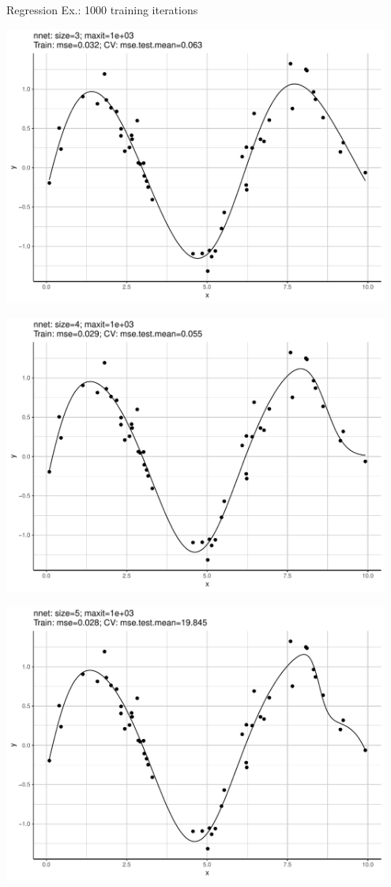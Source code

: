 \begin{vbframe}{Regression Ex.: 1000 training iterations}
\begin{knitrout}
{\centering \includegraphics[width=0.95\textwidth]{figure/unnamed-chunk-5-3} 

}




{\centering \includegraphics[width=0.95\textwidth]{figure/unnamed-chunk-5-4} 

}




{\centering \includegraphics[width=0.95\textwidth]{figure/unnamed-chunk-5-5} 

}
\end{knitrout}
\end{vbframe}
